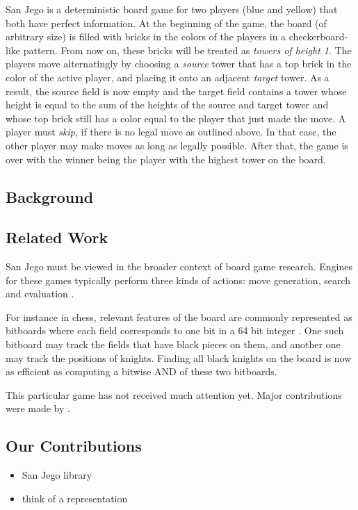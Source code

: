 \documentclass[sigconf]{acmart}
\begin{document}
San Jego is a deterministic board game for two players (blue and yellow) that both have perfect information.
At the beginning of the game, the board (of arbitrary size) is filled with bricks in the colors of the players in a checkerboard-like pattern.
From now on, these bricks will be treated as \emph{towers of height 1}.
The players move alternatingly by choosing a \emph{source} tower that has a top brick in the color of the active player, and placing it onto an adjacent \emph{target} tower.
As a result, the source field is now empty and the target field contains a tower whose height is equal to the sum of the heights of the source and target tower and whose top brick still has a color equal to the player that just made the move.
A player must \emph{skip}, if there is no legal move as outlined above.
In that case, the other player may make moves as long as legally possible.
After that, the game is over with the winner being the player with the highest tower on the board.


\subsection{Background}

\subsection{Related Work}
San Jego must be viewed in the broader context of board game research.
Engines for these games typically perform three kinds of actions: move generation, search and evaluation \cite{Bimonugroho2020}.

For instance in chess, relevant features of the board are commonly represented as bitboards where each field corresponds to one bit in a 64 bit integer \cite{Bimonugroho2020}.
One such bitboard may track the fields that have black pieces on them, and another one may track the positions of knights.
Finding all black knights on the board is now as efficient as computing a bitwise AND of these two bitboards.

This particular game has not received much attention yet.
Major contributions were made by \citeauthor{Althöfer2020} \cite{Althöfer2020}.

\subsection{Our Contributions}
\begin{itemize}
  \item San Jego library
  \item think of a representation
\end{itemize}
\end{document}
